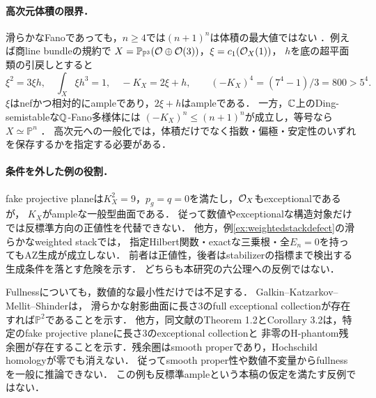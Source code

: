 \documentclass[11pt,a4paper]{ltjsarticle}
\begin{document}
\paragraph{高次元体積の限界．}
滑らかなFanoであっても，$n\geq4$では$(n+1)^n$は体積の最大値ではない
\cite[Introduction]{FujitaVolume}．例えば商line bundleの規約で
$X=\mathbb P_{\mathbb P^3}(\mathcal O\oplus\mathcal O(3))$，$\xi=c_1(\mathcal O_X(1))$，
$h$を底の超平面類の引戻しとすると
\[
 \xi^2=3\xi h,\quad \int_X\xi h^3=1,\quad -K_X=2\xi+h,
 \qquad (-K_X)^4=(7^4-1)/3=800>5^4.
\]
$\xi$はnefかつ相対的にampleであり，$2\xi+h$はampleである．
一方，$\mathbb C$上のDing-semistableな$\mathbb Q$-Fano多様体には
$(-K_X)^n\leq(n+1)^n$が成立し，等号なら$X\simeq\mathbb P^n$
\cite[Corollary 1.3]{FujitaVolume}\cite[Theorem 36]{LiuVolume}．
高次元への一般化では，体積だけでなく指数・偏極・安定性のいずれを保存するかを指定する必要がある．

\paragraph{条件を外した例の役割．}
fake projective planeは$K_X^2=9$，$p_g=q=0$を満たし，$\mathcal O_X$もexceptionalであるが，
$K_X$がampleな一般型曲面である\cite[\S1.1]{PrasadYeungFake}．
従って数値やexceptionalな構造対象だけでは反標準方向の正値性を代替できない．
他方，例\ref{ex:weightedstackdefect}の滑らかなweighted stackでは，
指定Hilbert関数・exactな三乗根・全$E_n=0$を持ってもAZ生成が成立しない．
前者は正値性，後者はstabilizerの指標まで検出する生成条件を落とす危険を示す．
どちらも本研究の六公理への反例ではない．

Fullnessについても，数値的な最小性だけでは不足する．
Galkin--Katzarkov--Mellit--Shinder\cite[Theorem 1.1(1)]{GKMSMinifolds}は，
滑らかな射影曲面に長さ3のfull exceptional collectionが存在すれば$\mathbb P^2$であることを示す．
他方，同文献のTheorem 1.2とCorollary 3.2は，特定のfake projective planeに長さ3のexceptional collectionと
非零のH-phantom残余圏が存在することを示す．残余圏はsmooth properであり，Hochschild homologyが零でも消えない．
従ってsmooth proper性や数値不変量からfullnessを一般に推論できない．
この例も反標準ampleという本稿の仮定を満たす反例ではない．
\end{document}
